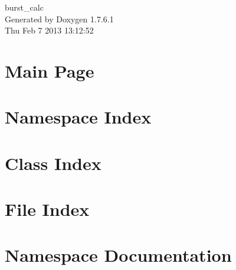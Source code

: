 \documentclass[a4paper]{book}
\begin{document}
\begin{titlepage}
\vspace*{7cm}
\begin{center}
{\Large burst\-\_\-calc }\\
\vspace*{1cm}
{\large \-Generated by Doxygen 1.7.6.1}\\
\vspace*{0.5cm}
{\small Thu Feb 7 2013 13:12:52}\\
\end{center}
\end{titlepage}
\clearemptydoublepage
{}
\tableofcontents
\clearemptydoublepage
{}
\chapter{\-Main \-Page}
\label{index}
\chapter{\-Namespace \-Index}

\chapter{\-Class \-Index}

\chapter{\-File \-Index}

\chapter{\-Namespace \-Documentation}










\end{document}
